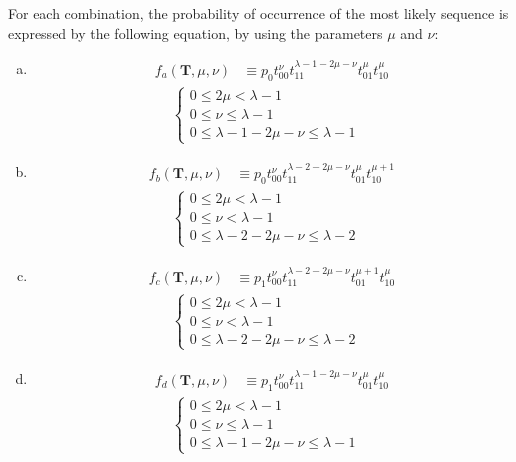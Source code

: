﻿\documentclass[a3paper,xelatex,english]{bxjsarticle}
\newcommand\mib[1]{\boldsymbol{#1}}
\begin{document}
For each combination, the probability of occurrence of the most likely sequence is expressed by the following equation, by using the parameters $\mu$ and $\nu$:
\begin{enumerate}[a)]
	\item 
	\begin{align}
		f_{a}(\mib{T}, \mu, \nu) & \equiv p_{0} t_{00}^{\nu} t_{11}^{\lambda - 1 - 2\mu - \nu} t_{01}^{\mu} t_{10}^{\mu} 
	\end{align}
	\begin{align}
	\begin{cases}
		0 \leq 2 \mu < \lambda - 1 & \\
		0 \leq \nu \leq \lambda - 1 & \\
		0 \leq \lambda - 1 - 2\mu - \nu \leq \lambda - 1
	\end{cases}
	\label{eq:fa}
	\end{align}
	\item 
	\begin{align}
		f_{b}(\mib{T}, \mu, \nu) & \equiv p_{0} t_{00}^{\nu} t_{11}^{\lambda - 2 - 2\mu - \nu} t_{01}^{\mu} t_{10}^{\mu + 1} 
	\end{align}
	\begin{align}
	\begin{cases}
		0 \leq 2 \mu < \lambda - 1 & \\
		0 \leq \nu < \lambda - 1 & \\
		0 \leq \lambda - 2 - 2\mu - \nu \leq \lambda - 2
	\end{cases}
	\label{eq:fb}
	\end{align}
	\item 
	\begin{align}
		f_{c}(\mib{T}, \mu, \nu) & \equiv p_{1} t_{00}^{\nu} t_{11}^{\lambda - 2 - 2\mu - \nu} t_{01}^{\mu + 1} t_{10}^{\mu} 
	\end{align}
	\begin{align}
	\begin{cases}
		0 \leq 2 \mu < \lambda - 1 & \\
		0 \leq \nu < \lambda - 1 & \\
		0 \leq \lambda - 2 - 2\mu - \nu \leq \lambda - 2
	\end{cases}
	\label{eq:fc}
	\end{align}
	\item 
	\begin{align}
		f_{d}(\mib{T}, \mu, \nu) & \equiv p_{1} t_{00}^{\nu} t_{11}^{\lambda - 1 - 2\mu - \nu} t_{01}^{\mu} t_{10}^{\mu} 
	\end{align}
	\begin{align}
	\begin{cases}
		0 \leq 2 \mu < \lambda - 1 & \\
		0 \leq \nu \leq \lambda - 1 & \\
		0 \leq \lambda - 1 - 2\mu - \nu \leq \lambda - 1
	\end{cases}
	\label{eq:fd}
	\end{align}
\end{enumerate}
\end{document}
